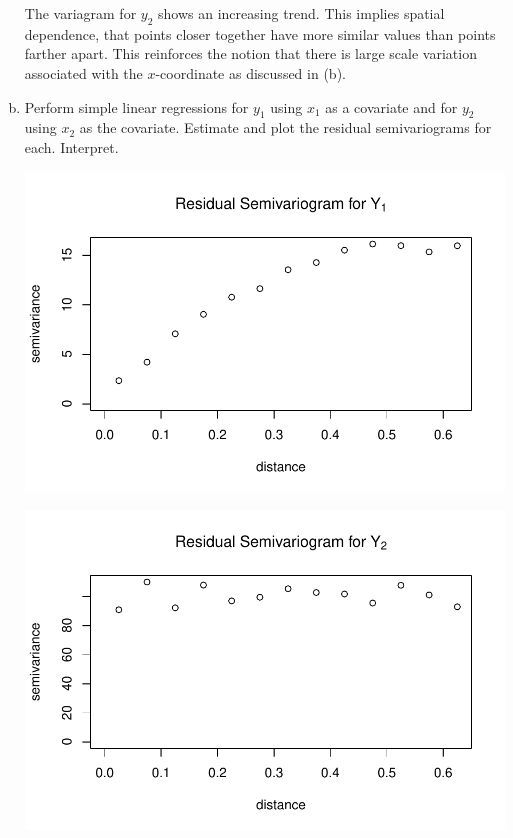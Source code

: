 \documentclass[letterpaper, 12pt]{article}\usepackage[]{graphicx}\usepackage[]{color}
\makeatletter
\def\maxwidth{ %
  \ifdim\Gin@nat@width>\linewidth
    \linewidth
  \else
    \Gin@nat@width
  \fi
}
\newenvironment{knitrout}{}{} %
\makeatother
\begin{document}
\begin{enumerate}[(a)]
{The variagram for $y_2$ shows an increasing trend. This implies spatial dependence, that points closer together have more similar values than points farther apart. This reinforces the notion that there is large scale variation associated with the $x$-coordinate as discussed in (b).}

\item
Perform simple linear regressions for $y_1$ using $x_1$ as a covariate and for $y_2$ using $x_2$ as the covariate. Estimate and plot the residual semivariograms for each. Interpret.

\begin{knitrout}
\color{fgcolor}
\includegraphics[width=\maxwidth]{figure/unnamed-chunk-3} 

\end{knitrout}

\begin{knitrout}
\color{fgcolor}
\includegraphics[width=\maxwidth]{figure/unnamed-chunk-4} 


\end{knitrout}
\end{enumerate}
\end{document}
